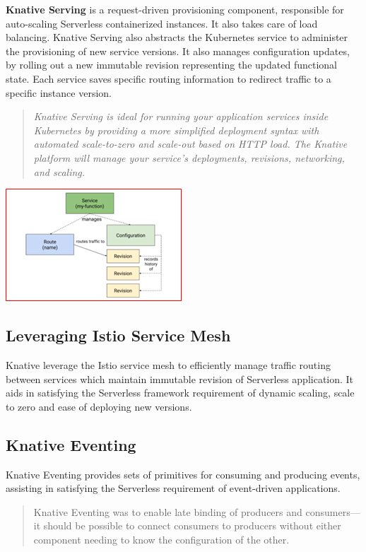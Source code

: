 \documentclass[12pt]{article}
\begin{document}
\begin{flushleft}
\textbf{Knative Serving} is a request-driven provisioning component, responsible for auto-scaling Serverless containerized instances. It also takes care of load balancing. 
Knative Serving also abstracts the Kubernetes service to administer the provisioning of new service versions. It also manages configuration updates, by rolling out a new immutable revision representing the updated functional state. Each service saves specific routing information to redirect traffic to a specific instance version.
\begin{quote}
   \textit{Knative Serving is ideal for running your application services inside Kubernetes by providing a more simplified deployment syntax with automated scale-to-zero and scale-out based on HTTP load. The Knative platform will manage your service’s deployments, revisions, networking, and scaling.} \\
   \cite{Sutter_Sampath_2020}
\end{quote}
\par
\includegraphics[]{images/knative-serving.png}

\subsection{Leveraging Istio Service Mesh}
Knative leverage the Istio service mesh to efficiently manage traffic routing between services which maintain immutable revision of Serverless application. It aids in satisfying the Serverless framework requirement of dynamic scaling, scale to zero and ease of deploying new versions.

\subsection{Knative Eventing}
Knative Eventing provides sets of primitives for consuming and producing events, assisting in satisfying the Serverless requirement of event-driven applications. 

\begin{quote}
Knative Eventing was to enable late binding of producers and consumers—it should be possible to connect consumers to producers without either component needing to know the configuration of the other. 
\end{quote}


\end{flushleft}
\end{document}
